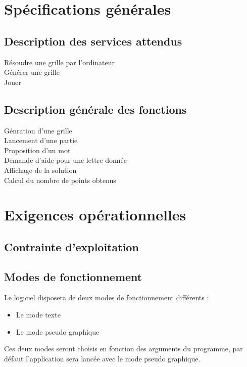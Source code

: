 \documentclass[12pt,a4paper,openany]{article}
\begin{document}
	\section{Spécifications générales} %
	\subsection{Description des services attendus}
		\begin{description}
			\item[Résoudre une grille par l'ordinateur]
			\item[Générer une grille]
			\item[Jouer] 
		\end{description}
	\subsection{Description générale des fonctions}
		\begin{description}
			\item[Génration d'une grille] 
			\item[Lancement d'une partie] 
			\item[Proposition d'un mot] 
			\item[Demande d'aide pour une lettre donnée]
			\item[Affichage de la solution] 
			\item[Calcul du nombre de points obtenus] 
		\end{description}
		

	\section{Exigences opérationnelles} %
	\subsection{Contrainte d'exploitation}
	\subsection{Modes de fonctionnement}
	Le logiciel disposera de deux modes de fonctionnement différents :
	\begin{itemize}
		\item Le mode texte
		\item Le mode pseudo graphique
	\end{itemize}
	Ces deux modes seront choisis en fonction des arguments du programme, par défaut l'application sera lancée avec le mode pseudo graphique.
\end{document}

